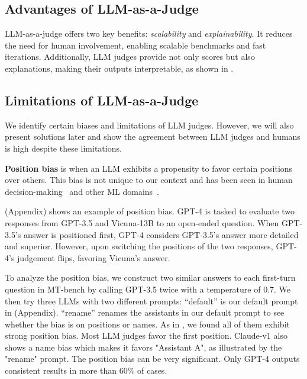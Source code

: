 \subsection{Advantages of LLM-as-a-Judge}
LLM-as-a-judge offers two key benefits: \textit{scalability} and \textit{explainability}. It reduces the need for human involvement, enabling scalable benchmarks and fast iterations. Additionally, LLM judges provide not only scores but also explanations, making their outputs interpretable, as shown in .

\subsection{Limitations of LLM-as-a-Judge}
\label{subsec:llmlimit}

We identify certain biases and limitations of LLM judges. However, we will also present solutions later and show the agreement between LLM judges and humans is high despite these limitations.

\textbf{Position bias} is when an LLM exhibits a propensity to favor certain positions over others. This bias is not unique to our context and has been seen in human decision-making~\cite {blunch1984position, raghubir2006center} and other ML domains~\cite{ko2020look, wang2018position}. 

 (Appendix) shows an example of position bias. 
GPT-4 is tasked to evaluate two responses from GPT-3.5 and Vicuna-13B to an open-ended question. When GPT-3.5's answer is positioned first, GPT-4 considers GPT-3.5's answer more detailed and superior. However, upon switching the positions of the two responses, GPT-4's judgement flips, favoring Vicuna's answer.

To analyze the position bias, we construct two similar answers to each first-turn question in MT-bench by calling GPT-3.5 twice with a temperature of 0.7.
We then try three LLMs with two different prompts:
``default'' is our default prompt in  (Appendix).
``rename'' renames the assistants in our default prompt to see whether the bias is on positions or names.
As in , we found all of them exhibit strong position bias. Most LLM judges favor the first position. Claude-v1 also shows a name bias which makes it favors "Assistant A", as illustrated by the "rename" prompt. The position bias can be very significant. Only GPT-4 outputs consistent results in more than 60\% of cases.

